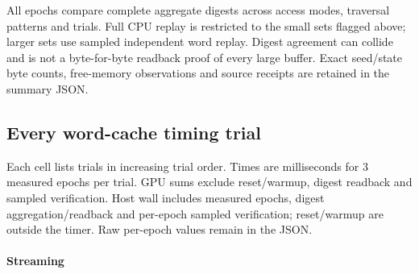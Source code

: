 All epochs compare complete aggregate digests across access modes, traversal patterns and trials. Full CPU replay is restricted to the small sets flagged above; larger sets use sampled independent word replay. Digest agreement can collide and is not a byte-for-byte readback proof of every large buffer. Exact seed/state byte counts, free-memory observations and source receipts are retained in the summary JSON.

\subsection{Every word-cache timing trial}

Each cell lists trials in increasing trial order. Times are milliseconds for 3 measured epochs per trial. GPU sums exclude reset/warmup, digest readback and sampled verification. Host wall includes measured epochs, digest aggregation/readback and per-epoch sampled verification; reset/warmup are outside the timer. Raw per-epoch values remain in the JSON.


\paragraph{Streaming}

